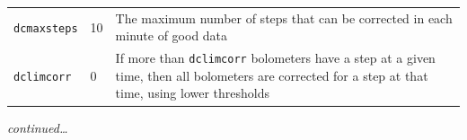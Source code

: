 \documentclass[twoside,11pt]{article}
\newenvironment{latexonly}{}{}
\renewcommand{\_}{\texttt{\symbol{95}}}
\newcommand{\param}[1]{\texttt{#1}}
\begin{document}
\begin{latexonly}
\begin{table}[h]
\begin{center}
\begin{small}
\begin{tabular}{|p{2.5cm}|p{1.0cm}|p{11.2cm}|}
\param{dcmaxsteps}    &   10 & The maximum number of steps that can be corrected
                               in each minute of good data \\
\param{dclimcorr}     &    0 & If more than \param{dclimcorr} bolometers have a step
                               at a given time, then all bolometers are corrected
                               for a step at that time, using lower thresholds \\
\hline
\end{tabular}
\end{small}
\end{center}
\begin{flushright}
\textit{continued\dots}
\end{flushright}
\end{table}


\end{latexonly}
\end{document}
